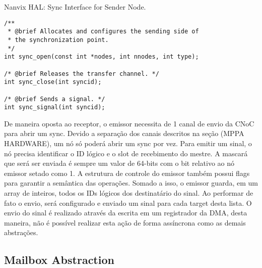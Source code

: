 \begin{listing}[!tb]
\caption{Nanvix HAL: Sync Interface for Sender Node.}
\label{code:hal-sync-sender}
\begin{verbatim}
/**
 * @brief Allocates and configures the sending side of
 * the synchronization point.
 */
int sync_open(const int *nodes, int nnodes, int type);

/* @brief Releases the transfer channel. */
int sync_close(int syncid);

/* @brief Sends a signal. */
int sync_signal(int syncid);
\end{verbatim}
\end{listing}

				De maneira oposta ao receptor, o emissor necessita de 1 canal de envio da CNoC para abrir um sync.
				Devido a separação dos canais descritos na seção (MPPA HARDWARE), um nó só poderá abrir um sync por vez.
				Para emitir um sinal, o nó precisa identificar o ID lógico e o slot de recebimento do mestre.
				A mascará que será ser enviada é sempre um valor de 64-bits com o bit relativo ao nó emissor setado como 1.
				A estrutura de controle do emissor também possui flags para garantir a semântica das operações.
				Somado a isso, o emissor guarda, em um array de inteiros, todos os IDs lógicos dos destinatário do sinal.
				Ao performar de fato o envio, será configurado e enviado um sinal para cada target desta lista.
				O envio do sinal é realizado através da escrita em um registrador da DMA, desta maneira, não é possível realizar esta ação de forma assíncrona como as demais abstrações.

		\subsection{Mailbox Abstraction}
		\label{sec.mailbox-abs}



